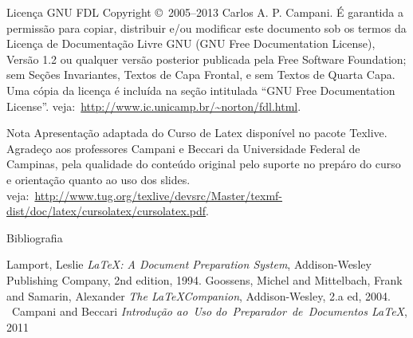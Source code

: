 

\begin{frame}[plain]
  \maketitle
\end{frame}

\begin{frame}{Licença GNU FDL}
	Copyright \copyright\ 2005--2013 Carlos A. P. Campani.\nn
 	É garantida a permissão para copiar, distribuir e/ou modificar este documento sob os termos da Licença de Documentação Livre GNU (GNU Free Documentation License), Versão 1.2 ou qualquer versão posterior publicada pela Free Software Foundation; sem Seções Invariantes, Textos de Capa Frontal, e sem Textos de Quarta Capa. Uma cópia da licença é incluída na seção intitulada ``GNU Free Documentation License''.\nn
	veja:~\scriptsize{\url{http://www.ic.unicamp.br/~norton/fdl.html}}.
\end{frame}

\begin{frame}{Nota}
	Apresentação adaptada do Curso de Latex disponível no pacote Texlive. Agradeço aos professores Campani e Beccari da Universidade Federal de Campinas, pela qualidade do conteúdo original pelo suporte no prepáro do curso e orientação quanto ao uso dos slides.\nn
	veja:~\scriptsize{\url{http://www.tug.org/texlive/devsrc/Master/texmf-dist/doc/latex/cursolatex/cursolatex.pdf}}.
\end{frame}

\begin{frame}{Bibliografia}
  \begin{thebibliography}{1}
     Lamport, Leslie \emph{\LaTeX: A Document Preparation System}, Addison-Wesley Publishing Company, 2nd edition, 1994.
     Goossens, Michel and Mittelbach, Frank and Samarin, Alexander \emph{The \LaTeX Companion}, Addison-Wesley, 2.a ed, 2004.
    \ Campani and Beccari \emph{Introdução ao~Uso do~Preparador~de~Documentos \LaTeX}, 2011
  \end{thebibliography}
\end{frame}

